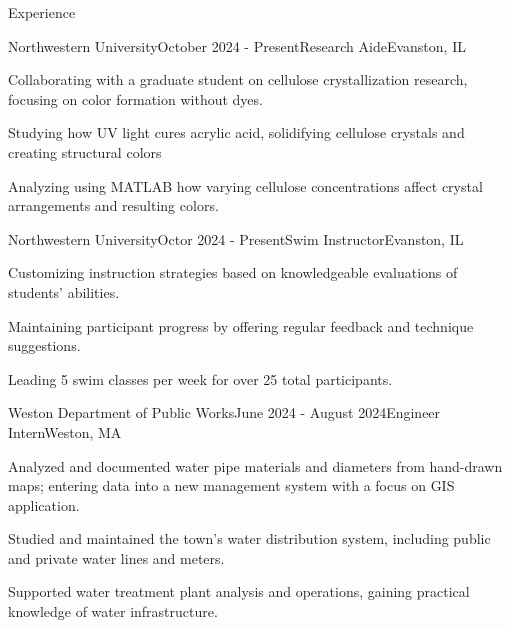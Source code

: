 \documentclass[
	a4paper, %
	10pt, %
]{resume} %
\begin{document}
\begin{rSection}{Experience}

	\begin{rSubsection}{Northwestern University}{October 2024 - Present}{Research Aide}{Evanston, IL}
		\item Collaborating with a graduate student on cellulose crystallization research, focusing on color formation without dyes.
		\item Studying how UV light cures acrylic acid, solidifying cellulose crystals and creating structural colors
		\item Analyzing using MATLAB how varying cellulose concentrations affect crystal arrangements and resulting colors.
	\end{rSubsection}


	\begin{rSubsection}{Northwestern University}{Octor 2024 - Present}{Swim Instructor}{Evanston, IL}
		\item Customizing instruction strategies based on knowledgeable evaluations of students' abilities.
		\item Maintaining participant progress by offering regular feedback and technique suggestions.
		\item Leading 5 swim classes per week for over 25 total participants.
	\end{rSubsection}


	\begin{rSubsection}{Weston Department of Public Works}{June 2024 - August 2024}{Engineer Intern}{Weston, MA}
		\item Analyzed and documented water pipe materials and diameters from hand-drawn maps; entering data into a new management system with a focus on GIS application.
		\item Studied and maintained the town’s water distribution system, including public and private water lines and meters.
		\item Supported water treatment plant analysis and operations, gaining practical knowledge of water infrastructure.
	\end{rSubsection}

\end{rSection}

\end{document}
